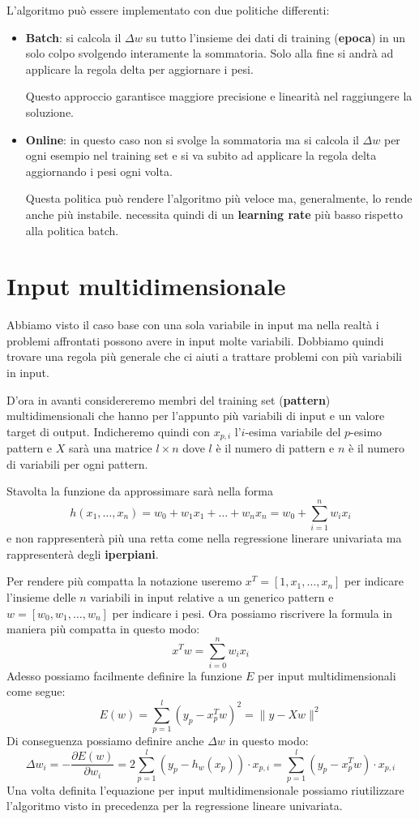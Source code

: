 L'algoritmo pu\`o essere implementato con due politiche differenti:
\begin{itemize}
	\item \textbf{Batch}: si calcola il $\Delta w$ su tutto l'insieme dei dati di training (\textbf{epoca}) in un solo
	      colpo svolgendo interamente la sommatoria. Solo alla fine si andr\`a ad applicare la regola delta per aggiornare
	      i pesi.

	      Questo approccio garantisce maggiore precisione e linearit\`a nel raggiungere la soluzione.
	\item \textbf{Online}: in questo caso non si svolge la sommatoria ma si calcola il $\Delta w$ per ogni esempio nel
	      training set e si va subito ad applicare la regola delta aggiornando i pesi ogni volta.

	      Questa politica pu\`o rendere l'algoritmo pi\`u veloce ma, generalmente, lo rende anche pi\`u instabile. necessita
	      quindi di un \textbf{learning rate} pi\`u basso rispetto alla politica batch.
\end{itemize}

\section{Input multidimensionale}
Abbiamo visto il caso base con una sola variabile in input ma nella realt\`a i problemi affrontati possono avere in input
molte variabili. Dobbiamo quindi trovare una regola pi\`u generale che ci aiuti a trattare problemi con pi\`u variabili in
input.

D'ora in avanti considereremo membri del training set (\textbf{pattern}) multidimensionali che hanno per l'appunto pi\`u
variabili di input e un valore target di output. Indicheremo quindi con $x_{p, i}$ l'$i$-esima variabile del $p$-esimo
pattern e $X$ sar\`a una matrice $l \times n$ dove $l$ \`e il numero di pattern e $n$ \`e il numero di variabili per ogni
pattern.

Stavolta la funzione da approssimare sar\`a nella forma
\[ h(x_1, \dots, x_n) = w_0 + w_1 x_1 + \dots + w_n x_n = w_0 + \sum_{i=1}^n w_i x_i \]
e non rappresenter\`a pi\`u una retta come nella regressione linerare univariata ma rappresenter\`a degli
\textbf{iperpiani}.

Per rendere pi\`u compatta la notazione useremo $x^T = [1, x_1, \dots, x_n]$ per indicare l'insieme delle $n$ variabili
in input relative a un generico pattern e $w = [w_0, w_1, \dots, w_n]$ per indicare i pesi. Ora possiamo riscrivere la
formula in maniera pi\`u compatta in questo modo:
\[ x^T w = \sum_{i=0}^n w_i x_i \]
Adesso possiamo facilmente definire la funzione $E$ per input multidimensionali come segue:
\[ E(w) = \sum_{p=1}^l (y_p - x^T_p w)^2 = \| y - X w \|^2 \]
Di conseguenza possiamo definire anche $\Delta w$ in questo modo:
\[
	\Delta w_i = -\frac{\partial E(w)}{\partial w_i} = 2 \sum_{p=1}^l (y_p - h_w(x_p)) \cdot x_{p, i} =
	\sum_{p=1}^l (y_p - x^T_p w) \cdot x_{p, i}
\]
Una volta definita l'equazione per input multidimensionale possiamo riutilizzare l'algoritmo visto in precedenza per la
regressione lineare univariata.

